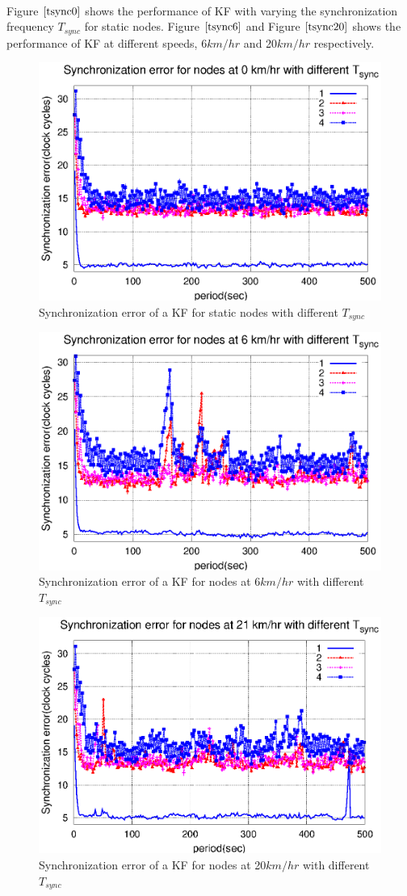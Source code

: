 \documentclass[a4paper,10pt]{report}
\begin{document}
\paragraph*{}
Figure $\ref{tsync0}$ shows the performance of KF with varying the synchronization frequency $T_{sync}$ for static nodes. Figure $\ref{tsync6}$ and Figure $\ref{tsync20}$ shows the performance of KF at different speeds, 6$km/hr$ and 20$km/hr$ respectively.
\begin{figure}[!h]
\centering
\includegraphics[width= 0.7 \textwidth]{tsync0}
\caption{Synchronization error of a KF for static nodes with different $T_{sync}$} \label{tsync0}
\end{figure}
\begin{figure}[!h]
\centering
\includegraphics[width= 0.7 \textwidth]{tsync6}
\caption{Synchronization error of a KF for nodes at 6$km/hr$ with different $T_{sync}$} \label{tsync6}
\end{figure}
\begin{figure}[!h]
\centering
\includegraphics[width= 0.7 \textwidth]{tsync20}
\caption{Synchronization error of a KF for nodes at 20$km/hr$ with different $T_{sync}$} \label{tsync20}
\end{figure}
\end{document}
